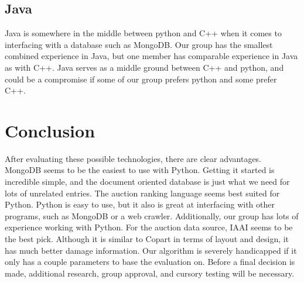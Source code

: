 \documentclass[draftclsnofoot,onecolumn,10pt]{IEEEtran}
\begin{document}
\subsection{Java}
Java is somewhere in the middle between python and C++ when it comes to interfacing with a database such as MongoDB. Our group has the smallest combined experience in Java, but one member has comparable experience in Java as with C++. Java serves as a middle ground between C++ and python, and could be a compromise if some of our group prefers python and some prefer C++. 

\section{Conclusion}
After evaluating these possible technologies, there are clear advantages. MongoDB seems to be the easiest to use with Python. Getting it started is incredible simple, and the document oriented database is just what we need for lots of unrelated entries. The auction ranking language seems best suited for Python. Python is easy to use, but it also is great at interfacing with other programs, such as MongoDB or a web crawler. Additionally, our group has lots of experience working with Python. For the auction data source, IAAI seems to be the best pick. Although it is similar to Copart in terms of layout and design, it has much better damage information. Our algorithm is severely handicapped if it only has a couple parameters to base the evaluation on. Before a final decision is made, additional research, group approval, and cursory testing will be necessary. 




\end{document}
